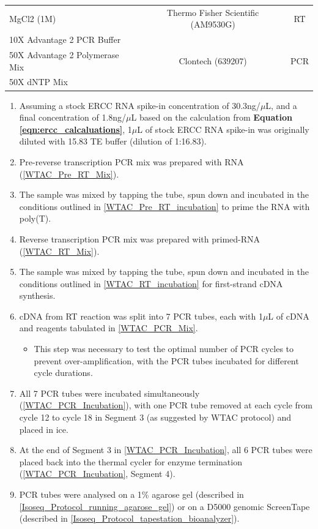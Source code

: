 \begin{table}[h]
\begin{tabularx}{0.95\textwidth}{lcc}
		MgCl2 (1M)                                                    & Thermo Fisher Scientific (AM9530G)                    & RT                   \\
		10X Advantage 2 PCR Buffer                                    & \multirow{3}{*}{Clontech (639207)}                    & \multirow{3}{*}{PCR} \\
		50X Advantage 2 Polymerase Mix                                &                                                       &                      \\
		50X dNTP Mix                                                  &                                                       &                      \\ \cmidrule(r){1-3}
	\end{tabularx}
\end{table}

\begin{enumerate}
	\item Assuming a stock ERCC RNA spike-in concentration of 30.3ng/$\mu$L, and a final concentration of 1.8ng/$\mu$L based on the calculation from \textbf{Equation \ref{eqn:ercc_calcaluations}}, 1$\mu$L of stock ERCC RNA spike-in was originally diluted with 15.83 TE buffer (dilution of 1:16.83). 
	\item Pre-reverse transcription PCR mix was prepared with RNA (\cref{WTAC_Pre_RT_Mix}).
	\item The sample was mixed by tapping the tube, spun down and incubated in the conditions outlined in \cref{WTAC_Pre_RT_incubation} to prime the RNA with poly(T).
	\item Reverse transcription PCR mix was prepared with primed-RNA (\cref{WTAC_RT_Mix}).
	\item The sample was mixed by tapping the tube, spun down and incubated in the conditions outlined in \cref{WTAC_RT_incubation} for first-strand cDNA synthesis.
	\item cDNA from RT reaction was split into 7 PCR tubes, each with 1$\mu$L of cDNA and reagents tabulated in \cref{WTAC_PCR_Mix}.
		\begin{itemize}
			\item This step was necessary to test the optimal number of PCR cycles to prevent over-amplification, with the PCR tubes incubated for different cycle durations.
		\end{itemize}
	\item All 7 PCR tubes were incubated simultaneously (\cref{WTAC_PCR_Incubation}), with one PCR tube removed at each cycle from cycle 12 to cycle 18 in Segment 3 (as suggested by WTAC protocol) and placed in ice.
	\item At the end of Segment 3 in \cref{WTAC_PCR_Incubation}, all 6 PCR tubes were placed back into the thermal cycler for enzyme termination (\cref{WTAC_PCR_Incubation}, Segment 4). 
	\item PCR tubes were analysed on a 1\% agarose gel (described in \cref{Isoseq_Protocol_running_agarose_gel}) or on a D5000 genomic ScreenTape (described in \cref{Isoseq_Protocol_tapestation_bioanalyzer}).	
\end{enumerate}

